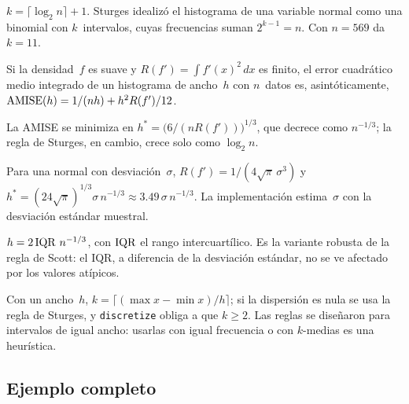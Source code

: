 \begin{regla}\label{regla:sturges}
$k = \lceil \log_2 n \rceil + 1$. Sturges idealizó el histograma de una variable normal como una binomial con $k$~intervalos, cuyas frecuencias suman $2^{k-1} = n$. Con $n = 569$ da $k = 11$.
\end{regla}

\begin{teorema}\label{teo:amise}
Si la densidad~$f$ es suave y $R(f') = \int f'(x)^2 \, dx$ es finito, el error cuadrático medio integrado de un histograma de ancho~$h$ con $n$~datos es, asintóticamente, $\operatorname{AMISE}(h) = 1/(nh) + h^2 R(f')/12$.
\end{teorema}

\begin{corolario}\label{cor:ancho-optimo}
La AMISE se minimiza en $h^{*} = \bigl( 6 / (n R(f')) \bigr)^{1/3}$, que decrece como $n^{-1/3}$; la regla de Sturges, en cambio, crece solo como $\log_2 n$.
\end{corolario}

\begin{corolario}\label{cor:scott}
Para una normal con desviación~$\sigma$, $R(f') = 1/(4\sqrt{\pi}\,\sigma^3)$ y $h^{*} = (24\sqrt{\pi})^{1/3} \sigma\, n^{-1/3} \approx 3.49\, \sigma\, n^{-1/3}$. La implementación estima~$\sigma$ con la desviación estándar muestral.
\end{corolario}

\begin{regla}\label{regla:fd}
$h = 2 \operatorname{IQR}\, n^{-1/3}$, con $\operatorname{IQR}$ el rango intercuartílico. Es la variante robusta de la regla de Scott: el IQR, a diferencia de la desviación estándar, no se ve afectado por los valores atípicos.
\end{regla}

\begin{observacion}\label{obs:ancho-k}
Con un ancho~$h$, $k = \lceil (\max x - \min x)/h \rceil$; si la dispersión es nula se usa la regla de Sturges, y \texttt{discretize} obliga a que $k \ge 2$. Las reglas se diseñaron para intervalos de igual ancho: usarlas con igual frecuencia o con $k$-medias es una heurística.
\end{observacion}


\subsection{Ejemplo completo}
\label{sec:ejemplo}

